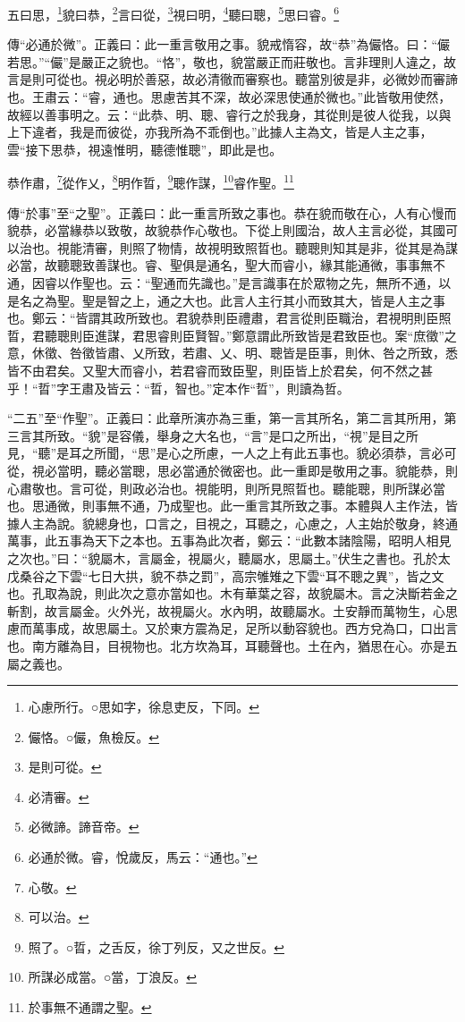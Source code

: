 五曰思，\footnote{心慮所行。○思如字，徐息吏反，下同。}貌曰恭，\footnote{儼恪。○儼，魚檢反。}言曰從，\footnote{是則可從。}視曰明，\footnote{必清審。}聽曰聰，\footnote{必微諦。諦音帝。}思曰睿。\footnote{必通於微。睿，悅歲反，馬云：“通也。”}


{\noindent\zhuan{}\fzbyks 傳“必通於微”。正義曰：此一重言敬用之事。貌戒惰容，故“恭”為儼恪。曰：“儼若思。”“儼”是嚴正之貌也。“恪”，敬也，貌當嚴正而莊敬也。言非理則人違之，故言是則可從也。視必明於善惡，故必清徹而審察也。聽當別彼是非，必微妙而審諦也。王肅云：“睿，通也。思慮苦其不深，故必深思使通於微也。”此皆敬用使然，故經以善事明之。云：“此恭、明、聰、睿行之於我身，其從則是彼人從我，以與上下違者，我是而彼從，亦我所為不乖倒也。”此據人主為文，皆是人主之事，雲“接下思恭，視遠惟明，聽德惟聰”，即此是也。 \par}

恭作肅，\footnote{心敬。}從作乂，\footnote{可以治。}明作晢，\footnote{照了。○晢，之舌反，徐丁列反，又之世反。}聰作謀，\footnote{所謀必成當。○當，丁浪反。}睿作聖。\footnote{於事無不通謂之聖。}

{\noindent\zhuan{}\fzbyks 傳“於事”至“之聖”。正義曰：此一重言所致之事也。恭在貌而敬在心，人有心慢而貌恭，必當緣恭以致敬，故貌恭作心敬也。下從上則國治，故人主言必從，其國可以治也。視能清審，則照了物情，故視明致照晢也。聽聰則知其是非，從其是為謀必當，故聽聰致善謀也。睿、聖俱是通名，聖大而睿小，緣其能通微，事事無不通，因睿以作聖也。云：“聖通而先識也。”是言識事在於眾物之先，無所不通，以是名之為聖。聖是智之上，通之大也。此言人主行其小而致其大，皆是人主之事也。鄭云：“皆謂其政所致也。君貌恭則臣禮肅，君言從則臣職治，君視明則臣照晢，君聽聰則臣進謀，君思睿則臣賢智。”鄭意謂此所致皆是君致臣也。案“庶徵”之意，休徵、咎徵皆肅、乂所致，若肅、乂、明、聰皆是臣事，則休、咎之所致，悉皆不由君矣。又聖大而睿小，若君睿而致臣聖，則臣皆上於君矣，何不然之甚乎！“晢”字王肅及皆云：“晢，智也。”定本作“晢”，則讀為哲。 \par}

{\noindent\shu{}\fzkt “二五”至“作聖”。正義曰：此章所演亦為三重，第一言其所名，第二言其所用，第三言其所致。“貌”是容儀，舉身之大名也，“言”是口之所出，“視”是目之所見，“聽”是耳之所聞，“思”是心之所慮，一人之上有此五事也。貌必須恭，言必可從，視必當明，聽必當聰，思必當通於微密也。此一重即是敬用之事。貌能恭，則心肅敬也。言可從，則政必治也。視能明，則所見照晢也。聽能聰，則所謀必當也。思通微，則事無不通，乃成聖也。此一重言其所致之事。本體與人主作法，皆據人主為說。貌總身也，口言之，目視之，耳聽之，心慮之，人主始於敬身，終通萬事，此五事為天下之本也。五事為此次者，鄭云：“此數本諸陰陽，昭明人相見之次也。”曰：“貌屬木，言屬金，視屬火，聽屬水，思屬土。”伏生之書也。孔於太戊桑谷之下雲“七日大拱，貌不恭之罰”，高宗雊雉之下雲“耳不聰之異”，皆之文也。孔取為說，則此次之意亦當如也。木有華葉之容，故貌屬木。言之決斷若金之斬割，故言屬金。火外光，故視屬火。水內明，故聽屬水。土安靜而萬物生，心思慮而萬事成，故思屬土。又於東方震為足，足所以動容貌也。西方兌為口，口出言也。南方離為目，目視物也。北方坎為耳，耳聽聲也。土在內，猶思在心。亦是五屬之義也。 \par}

